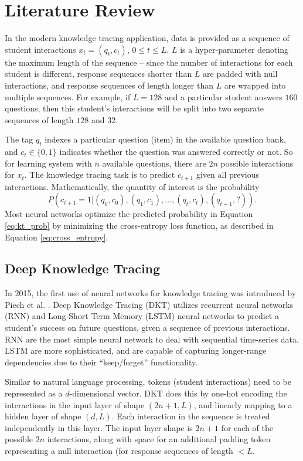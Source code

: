 \section{Literature Review}\label{sec:kt_lit}
In the modern knowledge tracing application, data is provided as a sequence of student interactions $x_t = (q_t, c_t)$, $0 \leq t \leq L$. $L$ is a hyper-parameter denoting the maximum length of the sequence -- since the number of interactions for each student is different, response sequences shorter than $L$ are padded with null interactions, and response sequences of length longer than $L$ are wrapped into multiple sequences. For example, if $L=128$ and a particular student answers $160$ questions, then this student's interactions will be split into two separate sequences of length $128$ and $32$.

The tag $q_t$ indexes a particular question (item) in the available question bank, and $c_t \in\{0,1\}$ indicates whether the question was answered correctly or not. So for learning system with $n$ available questions, there are $2n$ possible interactions for $x_t$. The knowledge tracing task is to predict $c_{t+1}$ given all previous interactions. Mathematically, the quantity of interest is the probability 
\begin{equation}
  P(c_{t+1} = 1 | (q_0,c_0), (q_1,c_1),\ldots,(q_t, c_t), (q_{t+1}, ?)).
  \label{eq:kt_prob}
\end{equation}
Most neural networks optimize the predicted probability in Equation \ref{eq:kt_prob} by  minimizing the cross-entropy loss function, as described in Equation \ref{eq:cross_entropy}.

\subsection{Deep Knowledge Tracing}
In 2015, the first use of neural networks for knowledge tracing was introduced by Piech et al. \cite{piech2015}. Deep Knowledge Tracing (DKT) utilizes recurrent neural networks (RNN) and Long-Short Term Memory (LSTM) neural networks to predict a student's success on future questions, given a sequence of previous interactions. RNN are the most simple neural network to deal with sequential time-series data.  LSTM are more sophisticated, and are capable of capturing longer-range dependencies due to their ``keep/forget'' functionality.

Similar to natural language processing, tokens (student interactions) need to be represented as a $d$-dimensional vector. DKT does this by one-hot encoding the interactions in the input layer of shape $(2n+1, L)$,  and linearly mapping to a hidden layer of shape $(d, L)$. Each interaction in the sequence is treated independently in this layer. The input layer shape is $2n+1$ for each of the possible $2n$ interactions, along with space for an additional padding token representing a null interaction (for response sequences of length $< L$.

